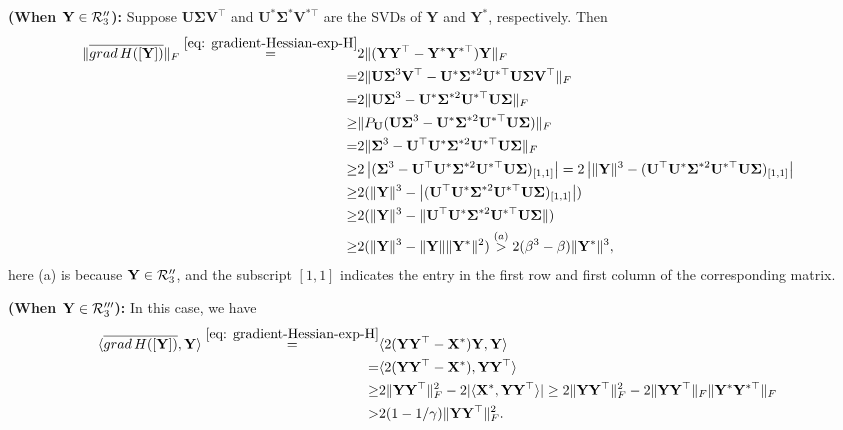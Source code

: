 \documentclass[11pt]{article}
\newcommand{\0}{{\mathbf{0}}}
\newcommand{\1}{{\mathbf{1}}}
\newcommand{\X}{{\mathbf{X}}}
\newcommand{\U}{{\mathbf{U}}}
\newcommand{\V}{{\mathbf{V}}}
\newcommand{\Y}{{\mathbf{Y}}}
\newcommand{\cR}{{\cal R}}
\newcommand{\bSigma}{\boldsymbol{\Sigma}}
\newcommand{\grad}{{\rm grad}}
\newcommand{\F}{{\rm F}}
\newcommand{\nc}{\normalcolor}
\begin{document}
{\bf (When $\Y \in \cR_3''$):} Suppose $\U \bSigma \V^\top$ and $\U^* \bSigma^* \V^{*\top}$ are the SVDs of $\Y$ and $\Y^*$, respectively. Then
\begin{equation*}
	\begin{split}
		\| \overline{\grad\, H([\Y])}\|_\F \overset{ \eqref{eq: gradient-Hessian-exp-H}}= & 2\|(\Y\Y^\top - \Y^* \Y^{*\top}) \Y\|_\F \\
		= & 2 \| \U \bSigma^3 \V^\top - \U^* \bSigma^{*2} \U^{*\top} \U \bSigma \V^\top \|_\F \\
		= & 2\| \U \bSigma^3 - \U^* \bSigma^{*2} \U^{*\top} \U \bSigma \|_\F \\
		\geq & \| P_\U (\U \bSigma^3 - \U^* \bSigma^{*2} \U^{*\top} \U \bSigma )   \|_\F \\
		= & 2\| \bSigma^3 -  \U^\top \U^*  \bSigma^{*2} \U^{*\top} \U \bSigma  \|_\F \\
		\geq & 2\left| (\bSigma^3 -  \U^\top \U^*  \bSigma^{*2} \U^{*\top} \U \bSigma)_{[1,1]} \right| = 2\left| \|\Y\|^3 - (\U^\top \U^*  \bSigma^{*2} \U^{*\top} \U \bSigma)_{[1,1]} \right| \\
		\geq & 2(\|\Y\|^3 - \left| (\U^\top \U^*  \bSigma^{*2} \U^{*\top} \U \bSigma)_{[1,1]}\right|)\\
		\geq & 2(\|\Y\|^3 - \|\U^\top \U^*  \bSigma^{*2} \U^{*\top} \U \bSigma\|)\\
		\geq & 2(\|\Y\|^3 - \|\Y\| \|\Y^*\|^2) \overset{(a)} > 2(\beta^3 - \beta) \|\Y^*\|^3,
	\end{split}
\end{equation*} here (a) is because $\Y \in \cR_3''$, and the subscript $[1,1]$ indicates the entry in the first row and first column of the corresponding matrix\nc.
	
{\bf (When $\Y \in \cR_3'''$):} In this case, we have
\begin{equation*} 
	\begin{split}
		\langle \overline{\grad\, H([\Y])} , \Y \rangle \overset{ \eqref{eq: gradient-Hessian-exp-H}}= & \langle 2(\Y \Y^\top -\X^*) \Y , \Y \rangle  \\
		= & \langle 2(\Y \Y^\top -\X^*) , \Y\Y^\top \rangle  \\
		\geq & 2 \|\Y\Y^\top\|_\F^2 - 2|\langle \X^* , \Y\Y^\top \rangle| \geq 2 \|\Y\Y^\top\|_\F^2 - 2  \|\Y\Y^\top\|_\F \|\Y^*\Y^{*\top}\|_\F\\
		> & 2 (1 - 1/\gamma )  \|\Y\Y^\top\|^2_\F.
	\end{split}
\end{equation*}
\end{document}
